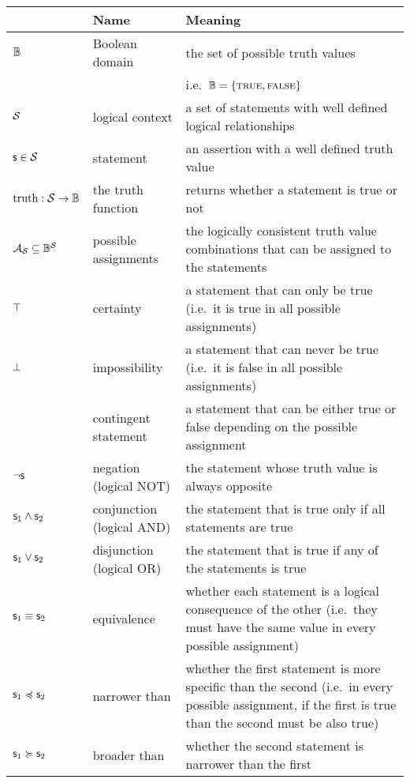 \documentclass[11pt,letterpaper,fleqn]{memoir} %
\begin{document}
\begin{tabular}{p{} p{} p{}}
	& Name & Meaning  \\ 
	\hline 
	$\mathbb{B}$  & Boolean domain & the set of possible truth values \\ 
	&  & i.e.~$\mathbb{B} = \{\textsc{true}, \textsc{false}\}$ \\ 
	\hline 
	$\mathcal{S}$ & logical context & a set of statements with well defined logical relationships \\ 
	\hline 
	$\mathsf{s} \in \mathcal{S}$ & statement & an assertion with a well defined truth value \\ 
	\hline 
	$\operatorname{truth} : \mathcal{S} \to \mathbb{B}$ & the truth function & returns whether a statement is true or not  \\ 
	\hline 
	$\mathcal{A}_{\mathcal{S}} \subseteq \mathbb{B}^{\mathcal{S}}$& possible assignments & the logically consistent truth value combinations that can be assigned to the statements \\ 
	\hline 
	$\top$ & certainty & a statement that can only be true (i.e.~it is true in all possible assignments) \\ 
	\hline 
	$\bot$ & impossibility & a statement that can never be true (i.e.~it is false in all possible assignments) \\ 
	\hline 
	& contingent statement & a statement that can be either true or false depending on the possible assignment \\ 
	\hline 
	$\neg \mathsf{s}$ & negation (logical NOT) & the statement whose truth value is always opposite \\ 
	\hline 
	$\mathsf{s}_1 \wedge \mathsf{s}_2$ & conjunction (logical AND) & the statement that is true only if all statements are true \\ 
	\hline 
	$\mathsf{s}_1 \vee \mathsf{s}_2$ & disjunction (logical OR) & the statement that is true if any of the statements is true \\ 
	\hline 
	$\mathsf{s}_1 \equiv \mathsf{s}_2$ & equivalence & whether each statement is a logical consequence of the other (i.e.~they must have the same value in every possible assignment) \\ 
	\hline 
	$\mathsf{s}_1 \preccurlyeq \mathsf{s}_2$ & narrower than & whether the first statement is more specific than the second (i.e.~in every possible assignment, if the first is true than the second must be also true) \\ 
	\hline 
	$\mathsf{s}_1 \succcurlyeq \mathsf{s}_2$ & broader than & whether the second statement is narrower than the first \\ 
	\hline 

\end{tabular}
\end{document}
